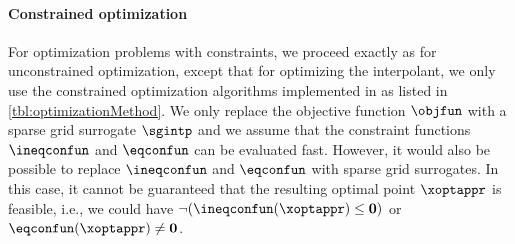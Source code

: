 \paragraph{Constrained optimization}

For optimization problems with constraints,
we proceed exactly as for unconstrained optimization,
except that for optimizing the interpolant, we only use the
constrained optimization algorithms implemented in \sgpp
as listed in \cref{tbl:optimizationMethod}.
We only replace the objective function $\objfun$ with a sparse grid
surrogate $\sgintp$ and we assume that the constraint functions
$\ineqconfun$ and $\eqconfun$ can be evaluated fast.
However, it would also be possible to replace $\ineqconfun$ and $\eqconfun$
with sparse grid surrogates.
In this case, it cannot be guaranteed that the resulting optimal point
$\xoptappr$ is feasible, i.e., we could have
$\lnot(\ineqconfun(\xoptappr) \le \*0)$ or $\eqconfun(\xoptappr) \not= \*0$.
